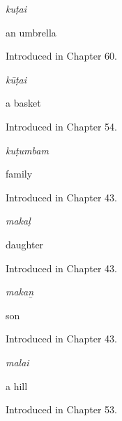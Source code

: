 \noindent\begin{minipage}[t]{\linewidth}
\raggedright
\textbf{}\enspace\emph{kuṭai}\par
\small an umbrella\par
\footnotesize Introduced in Chapter 60.
\end{minipage}\par\medskip

\noindent\begin{minipage}[t]{\linewidth}
\raggedright
\textbf{}\enspace\emph{kūṭai}\par
\small a basket\par
\footnotesize Introduced in Chapter 54.
\end{minipage}\par\medskip

\noindent\begin{minipage}[t]{\linewidth}
\raggedright
\textbf{}\enspace\emph{kuṭumbam}\par
\small family\par
\footnotesize Introduced in Chapter 43.
\end{minipage}\par\medskip

\noindent\begin{minipage}[t]{\linewidth}
\raggedright
\textbf{}\enspace\emph{makaḷ}\par
\small daughter\par
\footnotesize Introduced in Chapter 43.
\end{minipage}\par\medskip

\noindent\begin{minipage}[t]{\linewidth}
\raggedright
\textbf{}\enspace\emph{makaṉ}\par
\small son\par
\footnotesize Introduced in Chapter 43.
\end{minipage}\par\medskip

\noindent\begin{minipage}[t]{\linewidth}
\raggedright
\textbf{}\enspace\emph{malai}\par
\small a hill\par
\footnotesize Introduced in Chapter 53.
\end{minipage}\par\medskip


